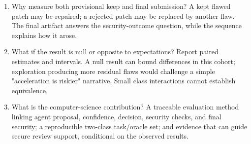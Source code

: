 \documentclass[12pt,a4paper]{article}
\begin{document}
\begin{enumerate}[label=Q\arabic*.,leftmargin=2.5em]
  \item Why measure both provisional keep and final submission? A kept flawed patch may be repaired; a rejected patch may be replaced by another flaw. The final artifact answers the security-outcome question, while the sequence explains how it arose.
  \item What if the result is null or opposite to expectations? Report paired estimates and intervals. A null result can bound differences in this cohort; exploration producing more residual flaws would challenge a simple "acceleration is riskier" narrative. Small class interactions cannot establish equivalence.
  \item What is the computer-science contribution? A traceable evaluation method linking agent proposal, confidence, decision, security checks, and final security; a reproducible two-class task/oracle set; and evidence that can guide secure review support, conditional on the observed results.
\end{enumerate}
\end{document}
